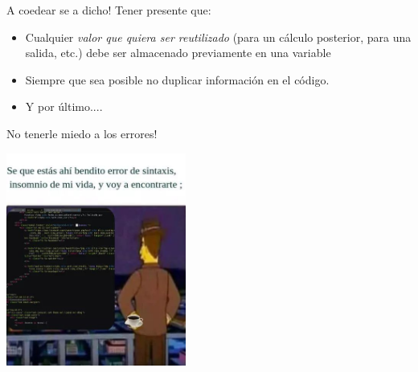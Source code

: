 \documentclass{beamer}
\begin{document}
\begin{frame}{A coedear se a dicho!}
Tener presente que:  \pause
\begin{itemize}
	\item Cualquier \emph{valor que quiera ser reutilizado} (para un cálculo posterior, para una salida, etc.) \alert{debe ser almacenado previamente en una variable} \pause
		\item Siempre que sea posible \alert{no duplicar información} en el código. \pause
		\item  Y por último.... 
\end{itemize} 
\end{frame}

\begin{frame}{No tenerle miedo a los errores!}
\begin{center}
\includegraphics[height=7cm, scale=0.5]{meme_error.jpg}
\end{center}
\end{frame}
\end{document}

